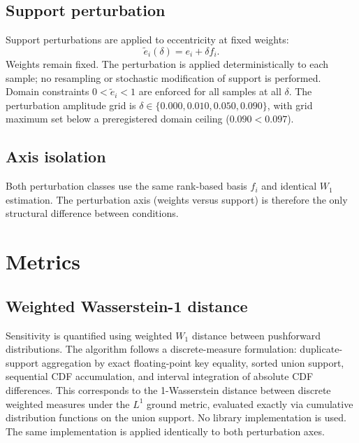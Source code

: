 \documentclass[a4paper,fleqn,usenatbib]{mnras}
\begin{document}
\subsection{Support perturbation}
\label{sec:supppert}

Support perturbations are applied to eccentricity at fixed weights:
\begin{equation}
  \tilde{e}_i(\delta) = e_i + \delta f_i.
  \label{eq:epert}
\end{equation}
Weights remain fixed. The perturbation is applied deterministically to each
sample; no resampling or stochastic modification of support is performed.
Domain constraints $0 < \tilde{e}_i < 1$ are enforced for all samples at all
$\delta$. The perturbation amplitude grid is
$\delta \in \{0.000, 0.010, 0.050, 0.090\}$, with grid maximum set below a
preregistered domain ceiling ($0.090 < 0.097$).

\subsection{Axis isolation}
\label{sec:isolation}

Both perturbation classes use the same rank-based basis $f_i$ and identical
$W_1$ estimation. The perturbation axis (weights versus support) is therefore
the only structural difference between conditions.

\section{Metrics}
\label{sec:metrics}

\subsection{Weighted Wasserstein-1 distance}
\label{sec:w1}

Sensitivity is quantified using weighted $W_1$ distance between pushforward
distributions. The algorithm follows a discrete-measure formulation:
duplicate-support aggregation by exact floating-point key equality, sorted
union support, sequential CDF accumulation, and interval integration of
absolute CDF differences. This corresponds to the 1-Wasserstein distance
between discrete weighted measures under the $L^1$ ground metric, evaluated
exactly via cumulative distribution functions on the union support. No library
implementation is used. The same implementation is applied identically to both
perturbation axes.
\end{document}
